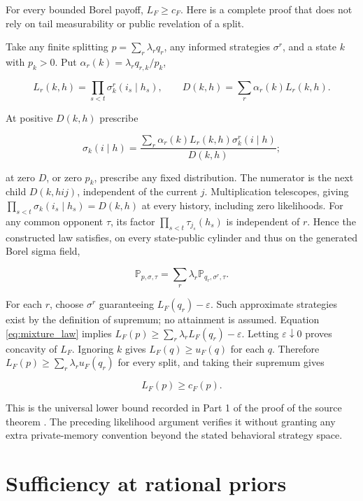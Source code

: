 \documentclass[11pt,a4paper]{article}
\begin{document}
For every bounded Borel payoff, \(L_F\ge c_F\). Here is a complete proof that does not rely on tail measurability or public revelation of a split.

Take any finite splitting \(p=\sum_r\lambda_rq_r\), any informed strategies \(\sigma^r\), and a state \(k\) with \(p_k>0\). Put \(\alpha_r(k)=\lambda_rq_{r,k}/p_k\),

\[
L_r(k,h)=\prod_{s<t}\sigma^r_k(i_s\mid h_s),\qquad
D(k,h)=\sum_r\alpha_r(k)L_r(k,h).
\]

At positive \(D(k,h)\) prescribe

\[
\sigma_k(i\mid h)=
\frac{\sum_r\alpha_r(k)L_r(k,h)\sigma^r_k(i\mid h)}{D(k,h)};
\]

at zero \(D\), or zero \(p_k\), prescribe any fixed distribution. The numerator is the next child \(D(k,hi j)\), independent of the current \(j\). Multiplication telescopes, giving \(\prod_{s<t}\sigma_k(i_s\mid h_s)=D(k,h)\) at every history, including zero likelihoods. For any common opponent \(\tau\), its factor \(\prod_{s<t}\tau_{j_s}(h_s)\) is independent of \(r\). Hence the constructed law satisfies, on every state-public cylinder and thus on the generated Borel sigma field,

\begin{equation}
\mathbb P_{p,\sigma,\tau}
 =\sum_r\lambda_r\mathbb P_{q_r,\sigma^r,\tau}. \label{eq:mixture_law}
\end{equation}

For each \(r\), choose \(\sigma^r\) guaranteeing \(L_F(q_r)-\varepsilon\). Such approximate strategies exist by the definition of supremum; no attainment is assumed. Equation \eqref{eq:mixture_law} implies \(L_F(p)\ge\sum_r\lambda_rL_F(q_r)-\varepsilon\). Letting \(\varepsilon\downarrow0\) proves concavity of \(L_F\). Ignoring \(k\) gives \(L_F(q)\ge u_F(q)\) for each \(q\). Therefore \(L_F(p)\ge\sum_r\lambda_ru_F(q_r)\) for every split, and taking their supremum gives

\begin{equation}
L_F(p)\ge c_F(p). \label{eq:universal_lower}
\end{equation}

This is the universal lower bound recorded in Part 1 of the proof of the source theorem \cite{KLS}. The preceding likelihood argument verifies it without granting any extra private-memory convention beyond the stated behavioral strategy space.

\section{Sufficiency at rational priors}
\end{document}
